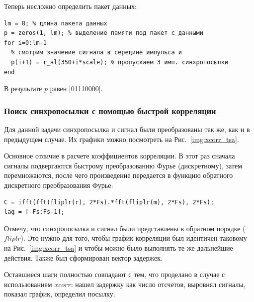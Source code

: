 \documentclass[12pt,a4paper]{article}
\begin{document}
Теперь несложно определить пакет данных:
\begin{verbatim}
lm = 8; % длина пакета данных
p = zeros(1, lm); % выделение памяти под пакет с данными
for i=0:lm-1
  % смотрим значение сигнала в середине импульса и
  p(i+1) = r_al(350+i*scale); % пропускаем 3 имп. синхропосылки
end
\end{verbatim}
В результате $p$ равен [01110000].

\subsubsection{Поиск синхропосылки с помощью быстрой корреляции}

Для данной задачи синхропосылка и сигнал были преобразованы так же, как и в предыдущем случае. Их графики можно посмотреть на Рис.~\ref{img:xcorr_tsa}.

Основное отличие в расчете коэффициентов корреляции. В этот раз сначала сигналы подвергаются быстрому преобразованию Фурье (дискретному), затем перемножаются, после чего произведение передается в функцию обратного дискретного преобразования Фурье:
\begin{verbatim}
C = ifft(fft(fliplr(r), 2*Fs).*fft(fliplr(m), 2*Fs), 2*Fs);
lag = [-Fs:Fs-1]; 
\end{verbatim}
Отмечу, что синхропосылка и сигнал были представлены в обратном порядке ($fliplr$). Это нужно для того, чтобы график корреляции был идентичен таковому на Рис.~\ref{img:xcorr_tsa} и чтобы можно было выполнять те же дальнейшие действия. Также был сформирован вектор задержек.

Оставшиеся шаги полностью совпадают с тем, что проделано в случае с использованием $xcorr$: нашел задержку как число отсчетов, выровнял сигналы, показал график, определил посылку.
\end{document}
